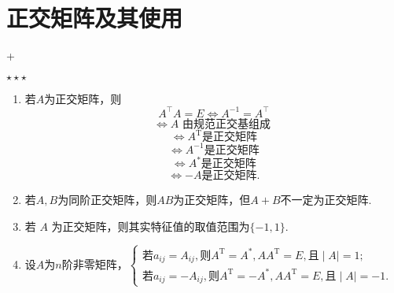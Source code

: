 \section{正交矩阵及其使用}
\DOne + \DTwoOne

$\star \star \star$

\begin{enumerate}
    \item 若$A$为正交矩阵，则
          $$A^\top A = E \Leftrightarrow A^{-1} = A^\top$$
          $$\Leftrightarrow A \text{ 由规范正交基组成 }$$
          $$\Leftrightarrow A^{\mathrm{T}}\text{是正交矩阵}$$
          $$\Leftrightarrow A^{-1}\text{是正交矩阵}$$
          $$\Leftrightarrow A^{*}\text{是正交矩阵}$$
          $$\Leftrightarrow-A\text{是正交矩阵.}$$
    \item 若$A,B$为同阶正交矩阵，则$AB$为正交矩阵，但$A+B$不一定为正交矩阵.
    \item ${\text{若 }A\text{ 为正交矩阵，则其实特征值的取值范围为}\{-1,1\}}.$
    \item 设$A$为$n$阶非零矩阵，$\begin{cases}\text{若}a_{ij}=A_{ij},\text{则}A^{\mathrm{T}}=A^{*},AA^{\mathrm{T}}=E,\text{且}\mid A\mid=1;\\\text{若}a_{ij}=-A_{ij},\text{则}A^{\mathrm{T}}=-A^*,AA^{\mathrm{T}}=E,\text{且}\mid A\mid=-1.\end{cases}$
\end{enumerate}